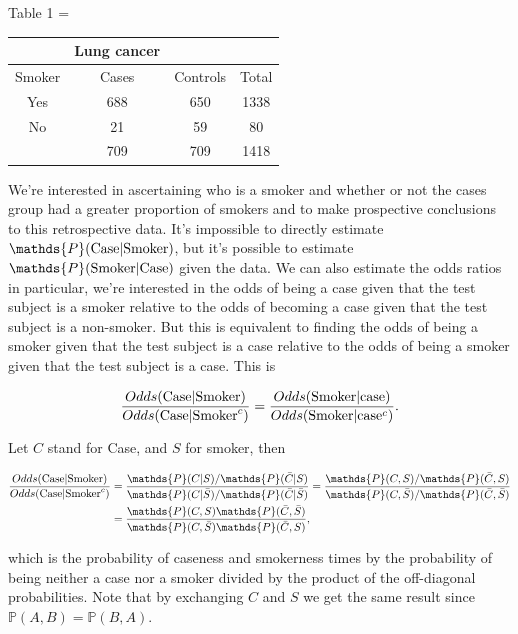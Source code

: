 \documentclass{homework}
\begin{document}
\begin{center}
Table 1 = 
\begin{tabular}{ |c|c|c|c| } 
& Lung cancer & \\
\hline
Smoker & Cases & Controls & Total \\
\hline
Yes & 688 & 650 & 1338 \\ 
No & 21 & 59 & 80\\  
\hline 
& 709 & 709 & 1418
\end{tabular}
\end{center}

We're interested in ascertaining who is a smoker and whether or not the cases group had a greater proportion of smokers and to make prospective conclusions to this retrospective data. It's impossible to directly estimate $\mathds{P}(\textnormal{Case}|\textnormal{Smoker})$, but it's possible to estimate $\mathds{P}(\textnormal{Smoker}|\textnormal{Case})$ given the data. We can also estimate the odds ratios in particular, we're interested in the odds of being a case given that the test subject is a smoker relative to the odds of becoming a case given that the test subject is a non-smoker. But this is equivalent to finding the odds of being a smoker given that the test subject is a case relative to the odds of being a smoker given that the test subject is a case. This is

$$
\frac{Odds(\textnormal{Case}|\textnormal{Smoker})}{Odds(\textnormal{Case}|\textnormal{Smoker}^c)} = \frac{Odds(\textnormal{Smoker}|\textnormal{case})}{Odds(\textnormal{Smoker}|\textnormal{case}^c)}.
$$

Let $C$ stand for Case, and $S$ for smoker, then

\begin{align*}
    \frac{Odds(\textnormal{Case}|\textnormal{Smoker})}{Odds(\textnormal{Case}|\textnormal{Smoker}^c)} &=\frac{\mathds{P}(C|S)/\mathds{P}(\bar{C}|S)}{{\mathds{P}(C|\bar{S})/\mathds{P}(\bar{C}|\bar{S})}} = \frac{\mathds{P}(C, S)/\mathds{P}(\bar{C}, S)}{{\mathds{P}(C, \bar{S})/\mathds{P}(\bar{C}, \bar{S})}}\\
    &=\frac{\mathds{P}(C, S)\mathds{P}(\bar{C}, \bar{S})}{{\mathds{P}(C, \bar{S})\mathds{P}(\bar{C}, {S})}},
\end{align*}

which is the probability of caseness and smokerness times by the probability of being neither a case nor a smoker divided by the product of the off-diagonal probabilities. Note that
by exchanging $C$ and $S$ we get the same result since $\mathds{P}(A,B)=\mathds{P}(B,A)$. 
\end{document}
